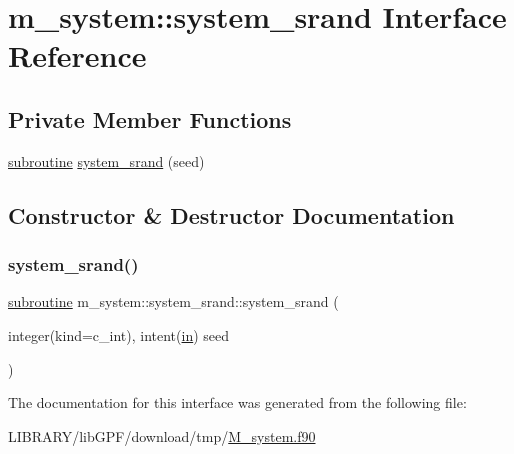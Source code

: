 \hypertarget{interfacem__system_1_1system__srand}{}\section{m\+\_\+system\+:\+:system\+\_\+srand Interface Reference}
\label{interfacem__system_1_1system__srand}
\subsection*{Private Member Functions}
\begin{DoxyCompactItemize}
\item 
\hyperlink{M__stopwatch_83_8txt_acfbcff50169d691ff02d4a123ed70482}{subroutine} \hyperlink{interfacem__system_1_1system__srand_ade7bd32973cd799f1362cec842bef377}{system\+\_\+srand} (seed)
\end{DoxyCompactItemize}


\subsection{Constructor \& Destructor Documentation}
\mbox{\label{interfacem__system_1_1system__srand_ade7bd32973cd799f1362cec842bef377}} 
\subsubsection{\texorpdfstring{system\+\_\+srand()}{system\_srand()}}
{\footnotesize\ttfamily \hyperlink{M__stopwatch_83_8txt_acfbcff50169d691ff02d4a123ed70482}{subroutine} m\+\_\+system\+::system\+\_\+srand\+::system\+\_\+srand (\begin{DoxyParamCaption}\item[{integer(kind=c\+\_\+int), intent(\hyperlink{M__journal_83_8txt_afce72651d1eed785a2132bee863b2f38}{in})}]{seed }\end{DoxyParamCaption})\hspace{0.3cm}{\ttfamily [private]}}



The documentation for this interface was generated from the following file\+:\begin{DoxyCompactItemize}
\item 
L\+I\+B\+R\+A\+R\+Y/lib\+G\+P\+F/download/tmp/\hyperlink{M__system_8f90}{M\+\_\+system.\+f90}\end{DoxyCompactItemize}

